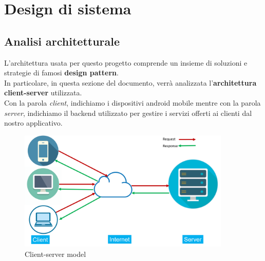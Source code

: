 \documentclass{article}
\begin{document}
	\section{Design di sistema}
		\subsection{Analisi architetturale}
		L'architettura usata per questo progetto comprende un insieme di soluzioni e strategie di famosi \textbf{design pattern}.
		\\
		In particolare, in questa sezione del documento, verrà analizzata l'\textbf{architettura client-server} utilizzata.
		\\
		Con la parola \textit{client}, indichiamo i dispositivi android mobile mentre con la parola \textit{server}, indichiamo il backend utilizzato per gestire i servizi offerti ai clienti dal nostro applicativo.
		\begin{figure}[H]
			\centering
			\includegraphics[width=0.9\textwidth]{Immagini/model}
			\caption{Client-server model}
		\end{figure}
\end{document}
